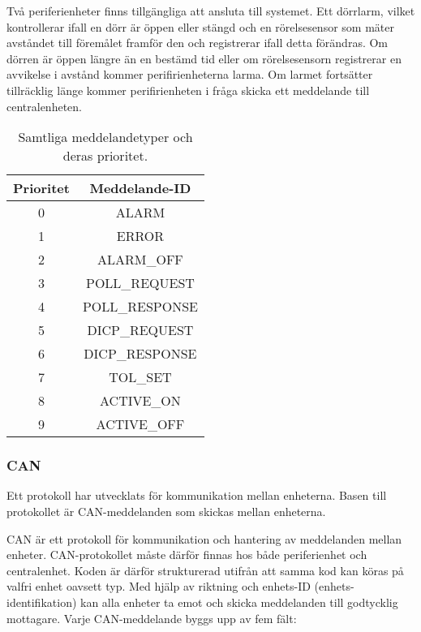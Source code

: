 \documentclass[a4paper]{article}
\begin{document}
Två periferienheter finns tillgängliga att ansluta till systemet. Ett dörrlarm, vilket kontrollerar ifall en dörr är öppen eller stängd och en rörelsesensor som mäter avståndet till föremålet framför den och registrerar ifall detta förändras. Om dörren är öppen längre än en bestämd tid eller om rörelsesensorn registrerar en avvikelse i avstånd kommer perifirienheterna larma. Om larmet fortsätter tillräcklig länge kommer perifirienheten i fråga skicka ett meddelande till centralenheten.

\begin{table}[H]
  \centering
  \begin{tabular}{|c|c|}
    \hline
    Prioritet & Meddelande-ID \\
    \hline
    0 & ALARM \\
    \hline
	  1 & ERROR \\
    \hline
	  2 & ALARM\_OFF \\
    \hline
	  3 & POLL\_REQUEST \\
    \hline
	  4 & POLL\_RESPONSE \\
    \hline
    5 & DICP\_REQUEST \\
    \hline
    6 & DICP\_RESPONSE \\
    \hline
    7 & TOL\_SET \\
    \hline
    8 & ACTIVE\_ON \\
    \hline
    9 & ACTIVE\_OFF \\
    \hline
  \end{tabular}
  \caption{Samtliga meddelandetyper och deras prioritet.}
  \label{tab:meddelandetyper}
\end{table}


\subsubsection{CAN}
Ett protokoll har utvecklats för kommunikation mellan enheterna. Basen till protokollet är CAN-meddelanden som skickas mellan enheterna.

CAN är ett protokoll för kommunikation och hantering av meddelanden mellan enheter. CAN-protokollet måste därför finnas hos både periferienhet och centralenhet. Koden är därför strukturerad utifrån att samma kod kan köras på valfri enhet oavsett typ. Med hjälp av riktning och enhets-ID (enhets-identifikation) kan alla enheter ta emot och skicka meddelanden till godtycklig mottagare. Varje CAN-meddelande byggs upp av fem fält:
\end{document}
